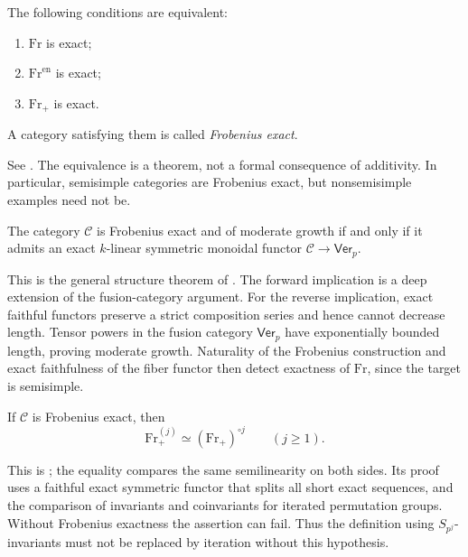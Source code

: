 \begin{theorem}
\label{lec23-frobenius-exact}
The following conditions are equivalent:
\begin{enumerate}
 \item $\mathrm{Fr}$ is exact;
 \item $\mathrm{Fr}^{\mathrm{en}}$ is exact;
 \item $\mathrm{Fr}_+$ is exact.
\end{enumerate}
A category satisfying them is called \emph{Frobenius exact}.
\end{theorem}
See \cite[Proposition 3.4]{CEOFrobenius}. The equivalence is a theorem,
not a formal consequence of additivity. In particular,
semisimple categories are Frobenius exact, but nonsemisimple examples
need not be.

\begin{theorem}
\label{lec23-ceo-fiber}
The category $\mathcal C$ is Frobenius exact and of moderate growth if
and only if it admits an exact $k$-linear symmetric monoidal functor
$\mathcal C\to\mathsf{Ver}_p$.
\end{theorem}
This is the general structure theorem of
\cite[Theorem 7.13]{CEOFrobenius}. The forward implication is a deep
extension of the fusion-category argument. For the reverse implication,
exact faithful functors preserve a strict composition series and hence
cannot decrease length. Tensor powers in the fusion category
$\mathsf{Ver}_p$ have exponentially bounded length, proving moderate
growth. Naturality of the Frobenius construction and exact faithfulness
of the fiber functor then detect exactness of $\mathrm{Fr}$, since the
target is semisimple.

\begin{lemma}[Iteration]\label{lec23-iteration}
If $\mathcal C$ is Frobenius exact, then
\[
 \mathrm{Fr}^{(j)}_+\simeq(\mathrm{Fr}_+)^{\circ j}
 \qquad(j\geq1).
\]
\end{lemma}
This is \cite[Lemma 5.1]{CEOFrobenius}; the equality compares the same
semilinearity on both sides. Its proof uses a faithful exact symmetric
functor that splits all short exact sequences, and the comparison of
invariants and coinvariants for iterated permutation groups. Without
Frobenius exactness the assertion can fail. Thus the definition using
$S_{p^j}$-invariants must not be replaced by iteration without this
hypothesis.

